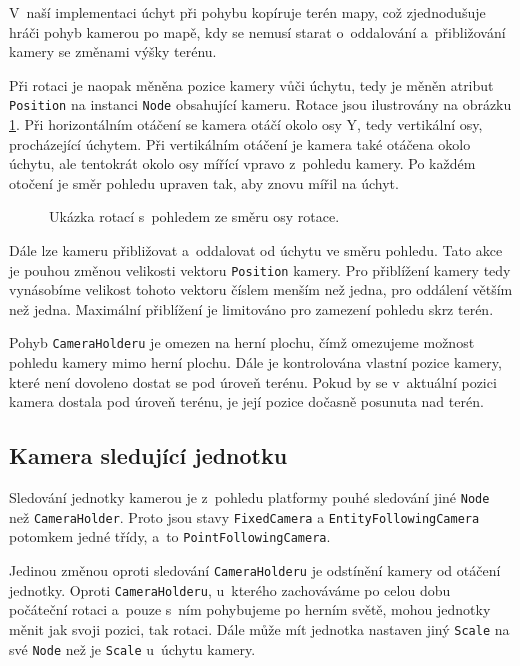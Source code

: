 V~naší implementaci úchyt při pohybu kopíruje terén mapy, což zjednodušuje hráči pohyb kamerou po mapě, kdy se nemusí starat o~oddalování a~přibližování kamery se změnami výšky terénu. 

Při rotaci je naopak měněna pozice kamery vůči úchytu, tedy je měněn atribut \texttt{Position} na instanci \texttt{Node} obsahující kameru. Rotace jsou ilustrovány na obrázku \ref{fig:rotation}. Při horizontálním otáčení se kamera otáčí okolo osy Y, tedy vertikální osy, procházející úchytem.  Při vertikálním otáčení je kamera také otáčena okolo úchytu, ale tentokrát okolo osy mířící vpravo z~pohledu kamery. Po každém otočení je směr pohledu upraven tak, aby znovu mířil na úchyt.

\begin{figure}[h]
	\centering
	\fontsize{8pt}{11pt}\selectfont
	\def\svgwidth{\textwidth}
	
	\caption{Ukázka rotací s~pohledem ze směru osy rotace.}
	\label{fig:rotation}
\end{figure}

Dále lze kameru přibližovat a~oddalovat od úchytu ve směru pohledu. Tato akce je pouhou změnou velikosti vektoru \texttt{Position} kamery. Pro přiblížení kamery tedy vynásobíme velikost tohoto vektoru číslem menším než jedna, pro oddálení větším než jedna. Maximální přiblížení je limitováno pro zamezení pohledu skrz terén.

Pohyb \texttt{CameraHolderu} je omezen na herní plochu, čímž omezujeme možnost pohledu kamery mimo herní plochu. Dále je kontrolována vlastní pozice kamery, které není dovoleno dostat se pod úroveň terénu. Pokud by se v~aktuální pozici kamera dostala pod úroveň terénu, je její pozice dočasně posunuta nad terén.

\subsection{Kamera sledující jednotku}
Sledování jednotky kamerou je z~pohledu platformy pouhé sledování jiné \texttt{Node} než \texttt{CameraHolder}. Proto jsou stavy \texttt{FixedCamera} a \texttt{EntityFollowingCamera} potomkem jedné třídy, a~to \texttt{PointFollowingCamera}. 

Jedinou změnou oproti sledování \texttt{CameraHolderu} je odstínění kamery od otáčení jednotky. Oproti \texttt{CameraHolderu}, u~kterého zachováváme po celou dobu počáteční rotaci a~pouze s~ním pohybujeme po herním světě, mohou jednotky měnit jak svoji pozici, tak rotaci. Dále může mít jednotka nastaven jiný \texttt{Scale} na své \texttt{Node} než je \texttt{Scale} u~úchytu kamery. 


